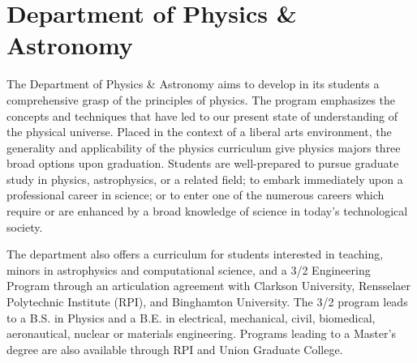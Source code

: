 \documentclass[12pt, preprint]{aastex}
\begin{document}
\section{Department of Physics \& Astronomy}
			
The Department of Physics \& Astronomy aims to develop in its students a
comprehensive grasp of the principles of physics. The program emphasizes the
concepts and techniques that have led to our present state of understanding of
the physical universe. Placed in the context of a liberal arts environment, the
generality and applicability of the physics curriculum give physics majors three
broad options upon graduation. Students are well-prepared to pursue graduate
study in physics, astrophysics, or a related field; to embark immediately upon a
professional career in science; or to enter one of the numerous careers which
require or are enhanced by a broad knowledge of science in today's technological
society.
					
The department also offers a curriculum for students interested in teaching,
minors in astrophysics and computational science, and a 3/2 Engineering Program
through an articulation agreement with Clarkson University, Rensselaer
Polytechnic Institute (RPI), and Binghamton University.  The 3/2 program leads
to a B.S. in Physics and a B.E. in electrical, mechanical, civil, biomedical,
aeronautical, nuclear or materials engineering.  Programs leading to a Master’s
degree are also available through RPI and Union Graduate College.


				
\end{document}
